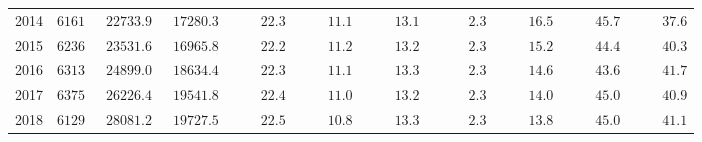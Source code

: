 \begin{table}[ht]
{\begin{tabular}{lcccccccccc}
2014  & $6161$ & $\phantom{0}22733.9$ & $\phantom{0}17280.3$ & $\phantom{0000}22.3$ & $\phantom{0000}11.1$ & $\phantom{0000}13.1$ & $\phantom{00000}2.3$ & $\phantom{0000}16.5$ & $\phantom{0000}45.7$ & $\phantom{0000}37.6$ \\
2015  & $6236$ & $\phantom{0}23531.6$ & $\phantom{0}16965.8$ & $\phantom{0000}22.2$ & $\phantom{0000}11.2$ & $\phantom{0000}13.2$ & $\phantom{00000}2.3$ & $\phantom{0000}15.2$ & $\phantom{0000}44.4$ & $\phantom{0000}40.3$ \\
2016  & $6313$ & $\phantom{0}24899.0$ & $\phantom{0}18634.4$ & $\phantom{0000}22.3$ & $\phantom{0000}11.1$ & $\phantom{0000}13.3$ & $\phantom{00000}2.3$ & $\phantom{0000}14.6$ & $\phantom{0000}43.6$ & $\phantom{0000}41.7$ \\
2017  & $6375$ & $\phantom{0}26226.4$ & $\phantom{0}19541.8$ & $\phantom{0000}22.4$ & $\phantom{0000}11.0$ & $\phantom{0000}13.2$ & $\phantom{00000}2.3$ & $\phantom{0000}14.0$ & $\phantom{0000}45.0$ & $\phantom{0000}40.9$ \\
2018  & $6129$ & $\phantom{0}28081.2$ & $\phantom{0}19727.5$ & $\phantom{0000}22.5$ & $\phantom{0000}10.8$ & $\phantom{0000}13.3$ & $\phantom{00000}2.3$ & $\phantom{0000}13.8$ & $\phantom{0000}45.0$ & $\phantom{0000}41.1$ \\
\hline 
\end{tabular}	
	}
\end{table}